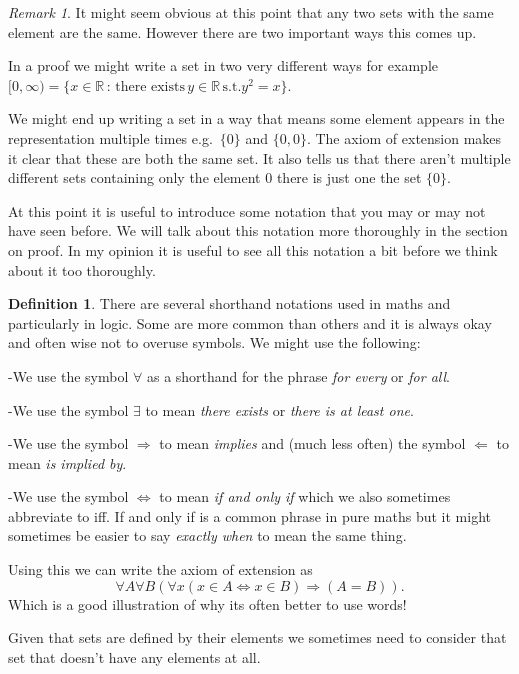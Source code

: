 \documentclass[
]{book}
\theoremstyle{definition}
\newtheorem{definition}{Definition}[chapter]
\theoremstyle{definition}
\theoremstyle{definition}
\theoremstyle{definition}
\theoremstyle{remark}
\newtheorem*{remark}{Remark}
\begin{document}
\begin{remark}
It might seem obvious at this point that any two sets with the same element are the same. However there are two important ways this comes up.

In a proof we might write a set in two very different ways for example \([0,\infty) = \{ x \in \mathbb{R} \,:\, \mbox{there exists}\, y \in \mathbb{R}\, \mbox{s.t.} y^2 = x\}\).

We might end up writing a set in a way that means some element appears in the representation multiple times e.g.~\(\{0\}\) and \(\{0, 0\}\). The axiom of extension makes it clear that these are both the same set. It also tells us that there aren't multiple different sets containing only the element \(0\) there is just one the set \(\{0\}\).
\end{remark}

At this point it is useful to introduce some notation that you may or may not have seen before. We will talk about this notation more thoroughly in the section on proof. In my opinion it is useful to see all this notation a bit before we think about it too thoroughly.

\begin{definition}
There are several shorthand notations used in maths and particularly in logic. Some are more common than others and it is always okay and often wise not to overuse symbols. We might use the following:

-We use the symbol \(\forall\) as a shorthand for the phrase \emph{for every} or \emph{for all}.

-We use the symbol \(\exists\) to mean \emph{there exists} or \emph{there is at least one}.

-We use the symbol \(\Rightarrow\) to mean \emph{implies} and (much less often) the symbol \(\Leftarrow\) to mean \emph{is implied by}.

-We use the symbol \(\Leftrightarrow\) to mean \emph{if and only if} which we also sometimes abbreviate to iff. If and only if is a common phrase in pure maths but it might sometimes be easier to say \emph{exactly when} to mean the same thing.
\end{definition}

Using this we can write the axiom of extension as
\[ \forall A \forall B ( \forall x (x \in A \Leftrightarrow x \in B) \Rightarrow (A=B)).   \] Which is a good illustration of why its often better to use words!

Given that sets are defined by their elements we sometimes need to consider that set that doesn't have any elements at all.
\end{document}
